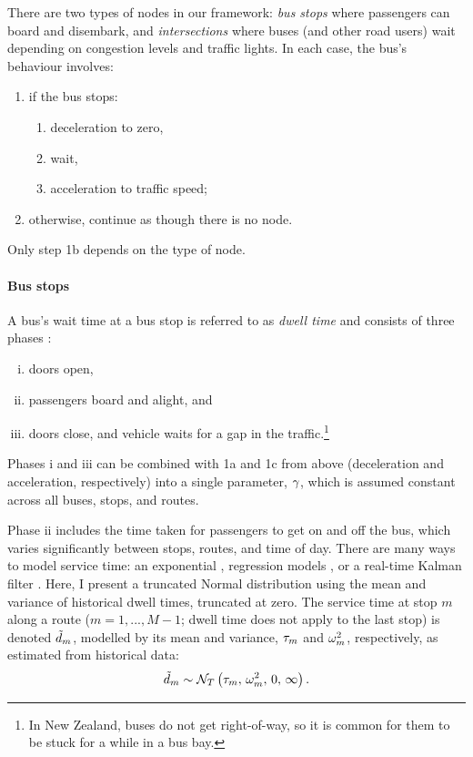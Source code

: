 There are two types of nodes in our framework: \emph{bus stops} where passengers can board and disembark, and \emph{intersections} where buses (and other road users) wait depending on congestion levels and traffic lights. In each case, the bus's behaviour involves:
\begin{enumerate}
\item if the bus stops:
    \begin{enumerate}
    \item deceleration to zero,
    \item wait,
    \item acceleration to traffic speed;
    \end{enumerate}
\item otherwise, continue as though there is no node.
\end{enumerate}
Only step 1b depends on the type of node.



\paragraph{Bus stops}

A bus's wait time at a bus stop is referred to as \emph{dwell time} and consists of three phases \citep{Hans_2015,Robinson_2013,Meng_2013,Wang_2016}:
\begin{enumerate}[i.]
\item doors open,
\item passengers board and alight, and
\item doors close, and vehicle waits for a gap in the traffic.\footnote{In New Zealand, buses do not get right-of-way, so it is common for them to be stuck for a while in a bus bay.}
\end{enumerate}
Phases i and iii can be combined with 1a and 1c from above (deceleration and acceleration, respectively) into a single parameter, $\gamma$, which is assumed constant across all buses, stops, and routes.


Phase ii includes the time taken for passengers to get on and off the bus, which varies significantly between stops, routes, and time of day. There are many ways to model service time: an exponential \citep{Hans_2015}, regression models \citep{Shen_2013}, or a real-time Kalman filter \citep{Shalaby_2004}. Here, I present a truncated Normal distribution using the mean and variance of historical dwell times, truncated at zero. The service time at stop $m$ along a route ($m=1,...,M-1$; dwell time does not apply to the last stop) is denoted $\tilde d_m$, modelled by its mean and variance, $\tau_m$ and $\omega^2_m$, respectively, as estimated from historical data:
\begin{equation}
\label{eq:stop_dwell_time}
\tilde d_m \sim \mathcal{N}_T\left(\tau_m,\, \omega^2_m,\, 0,\, \infty\right).
\end{equation}


